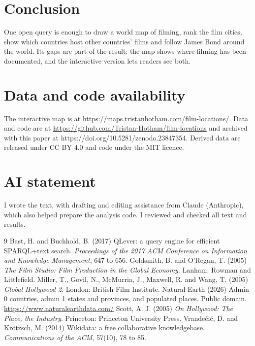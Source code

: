 \documentclass[11pt,a4paper]{article}
\begin{document}
\section{Conclusion}
One open query is enough to draw a world map of filming, rank the film cities, show which countries host other countries' films and follow James Bond around the world. Its gaps are part of the result: the map shows where filming has been documented, and the interactive version lets readers see both.

\section*{Data and code availability}
The interactive map is at \url{https://maps.tristanhotham.com/film-locations/}. Data and code are at \url{https://github.com/Tristan-Hotham/film-locations} and archived with this paper at https://doi.org/10.5281/zenodo.23847354. Derived data are released under CC BY 4.0 and code under the MIT licence.

\section*{AI statement}
I wrote the text, with drafting and editing assistance from Claude (Anthropic), which also helped prepare the analysis code. I reviewed and checked all text and results.

\begin{thebibliography}{9}
 Bast, H. and Buchhold, B. (2017) QLever: a query engine for efficient SPARQL+text search. \emph{Proceedings of the 2017 ACM Conference on Information and Knowledge Management}, 647 to 656.
 Goldsmith, B. and O'Regan, T. (2005) \emph{The Film Studio: Film Production in the Global Economy}. Lanham: Rowman and Littlefield.
 Miller, T., Govil, N., McMurria, J., Maxwell, R. and Wang, T. (2005) \emph{Global Hollywood 2}. London: British Film Institute.
 Natural Earth (2026) Admin 0 countries, admin 1 states and provinces, and populated places. Public domain. \url{https://www.naturalearthdata.com/}
 Scott, A. J. (2005) \emph{On Hollywood: The Place, the Industry}. Princeton: Princeton University Press.
 Vrande\v{c}i\'c, D. and Kr\"otzsch, M. (2014) Wikidata: a free collaborative knowledgebase. \emph{Communications of the ACM}, 57(10), 78 to 85.
\end{thebibliography}
\end{document}
